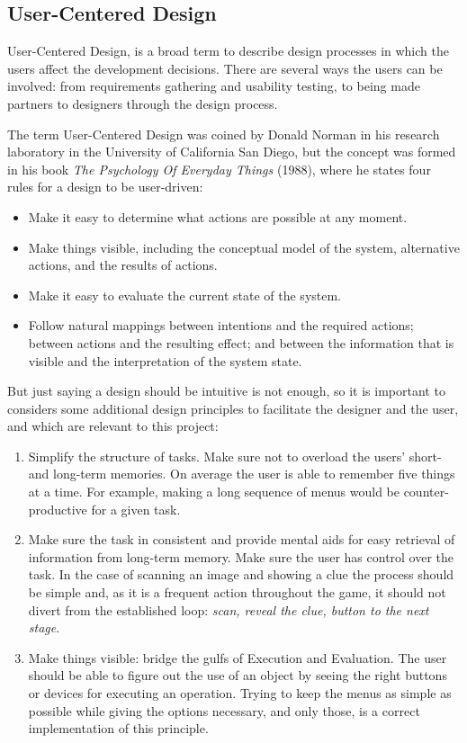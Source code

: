 \documentclass[runningheads]{llncs}
\begin{document}
\subsection{User-Centered Design}
\par User-Centered Design, is a broad term to describe design processes in which the users affect the development decisions. There are several ways the users can be involved: from requirements gathering and usability testing, to being made partners to designers through the design process.
\par The term User-Centered Design was coined by Donald Norman in his research laboratory in the University of California San Diego, but the concept was formed in his book \textit{The Psychology Of Everyday Things} (1988), where he states four rules for a design to be user-driven:
\begin{itemize}
    \item Make it easy to determine what actions are possible at any moment.
    \item Make things visible, including the conceptual model of the system, alternative actions, and the results of actions. 
    \item Make it easy to evaluate the current state of the system.
    \item Follow natural mappings between intentions and the required actions; between actions and the resulting effect; and between the information that is visible and the interpretation of the system state.
\end{itemize}
\par But just saying a design should be intuitive is not enough, so it is important to considers some additional design principles to facilitate the designer and the user, and which are relevant to this project:
\begin{enumerate}
    \item Simplify the structure of tasks. Make sure not to overload the users' short- and long-term memories. On average the user is able to remember five things at a time. For example, making a long sequence of menus would be counter-productive for a given task. 
    \item Make sure the task in consistent and provide mental aids for easy retrieval of information from long-term memory. Make sure the user has control over the task. In the case of scanning an image and showing a clue the process should be simple and, as it is a frequent action throughout the game, it should not divert from the established loop: \textit{scan, reveal the clue, button to the next stage}. 
    \item Make things visible: bridge the gulfs of Execution and Evaluation. The user should be able to figure out the use of an object by seeing the right buttons or devices for executing an operation. Trying to keep the menus as simple as possible while giving the options necessary, and only those, is a correct implementation of this principle.
\end{enumerate} 
\end{document}
